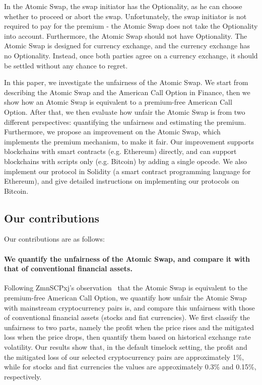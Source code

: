 In the Atomic Swap, the swap initiator has the Optionality, as he can choose whether to proceed or abort the swap.
Unfortunately, the swap initiator is not required to pay for the premium - the Atomic Swap does not take the Optionality into account.
Furthermore, the Atomic Swap should not have Optionality.
The Atomic Swap is designed for currency exchange, and the currency exchange has no Optionality.
Instead, once both parties agree on a currency exchange, it should be settled without any chance to regret.

In this paper, we investigate the unfairness of the Atomic Swap.
We start from describing the Atomic Swap and the American Call Option in Finance,
then we show how an Atomic Swap is equivalent to a premium-free American Call Option.
After that, we then evaluate how unfair the Atomic Swap is from two different perspectives:
quantifying the unfairness and estimating the premium.
Furthermore, we propose an improvement on the Atomic Swap, which implements the premium mechanism, to make it fair.
Our improvement supports blockchains with smart contracts (e.g. Ethereum) directly, and can support blockchains with scripts only (e.g. Bitcoin) by adding a single opcode.
We also implement our protocol in Solidity (a smart contract programming language for Ethereum), and give detailed instructions on implementing our protocols on Bitcoin.

\subsection{Our contributions}

Our contributions are as follows:

\paragraph{We quantify the unfairness of the Atomic Swap, and compare it with that of conventional financial assets.}
Following ZmnSCPxj's observation~\cite{optionality-origin} that the Atomic Swap is equivalent to the premium-free American Call Option,
we quantify how unfair the Atomic Swap with mainstream cryptocurrency pairs is, and compare this unfairness with those of conventional financial assets (stocks and fiat currencies).
We first classify the unfairness to two parts, namely the profit when the price rises and the mitigated loss when the price drops, then quantify them based on historical exchange rate volatility.
Our results show that, in the default timelock setting, the profit and the mitigated loss of our selected cryptocurrency pairs are approximately 1\%, while for stocks and fiat currencies the values are approximately 0.3\% and 0.15\%, respectively.

